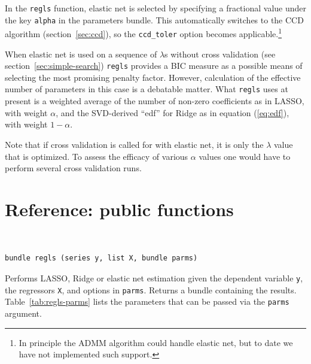 \documentclass{article}
\newenvironment{funcdoc}
{\noindent\hrulefill\\[-12pt]}
{\medbreak}
\begin{document}
In the \texttt{regls} function, elastic net is selected by specifying
a fractional value under the key \texttt{alpha} in the parameters
bundle. This automatically switches to the CCD algorithm
(section~\ref{sec:ccd}), so the \texttt{ccd\_toler} option becomes
applicable.\footnote{In principle the ADMM algorithm could handle
  elastic net, but to date we have not implemented such support.}

When elastic net is used on a sequence of $\lambda$s without cross
validation (see section~\ref{sec:simple-search}) \texttt{regls}
provides a BIC measure as a possible means of selecting the most
promising penalty factor. However, calculation of the effective number
of parameters in this case is a debatable matter. What \texttt{regls}
uses at present is a weighted average of the number of non-zero
coefficients as in LASSO, with weight $\alpha$, and the SVD-derived
``edf'' for Ridge as in equation (\ref{eq:edf}), with weight
$1-\alpha$.

Note that if cross validation is called for with elastic net, it is
only the $\lambda$ value that is optimized. To assess the efficacy of
various $\alpha$ values one would have to perform several cross
validation runs.

\section{Reference: public functions}
\label{sec:funcref}

\begin{funcdoc}
\begin{verbatim}
bundle regls (series y, list X, bundle parms)
\end{verbatim}
  Performs LASSO, Ridge or elastic net estimation given the dependent
  variable \texttt{y}, the regressors \texttt{X}, and options in
  \texttt{parms}. Returns a bundle containing the
  results. Table~\ref{tab:regls-parms} lists the parameters that can
  be passed via the \texttt{parms} argument.
\end{funcdoc}
\end{document}
